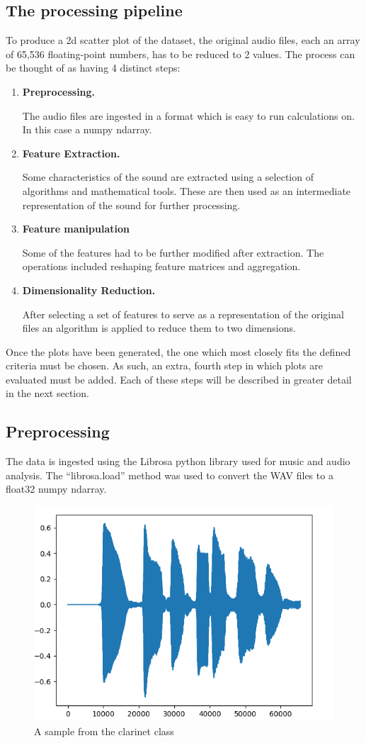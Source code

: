 \documentclass[11pt]{article}
\begin{document}
\subsection{The processing pipeline}
\label{sec:org82c3cb3}

To produce a 2d scatter plot of the dataset, the original audio files, each an array of 65,536 floating-point numbers, has to be reduced to 2 values.
The process can be thought of as having 4 distinct steps:
\begin{enumerate}
\item \textbf{ Preprocessing. }

The audio files are ingested in a format which is easy to run calculations on. In this case a numpy ndarray.
\item \textbf{ Feature Extraction. }

Some characteristics of the sound are extracted using a selection of algorithms and mathematical tools. These are then used as an intermediate representation of the sound for further processing.
\item \textbf{ Feature manipulation }

Some of the features had to be further modified after extraction. The operations included reshaping feature matrices and aggregation.
\item \textbf{ Dimensionality Reduction. }

After selecting a set of features to serve as a representation of the original files an algorithm is applied to reduce them to two dimensions.
\end{enumerate}
Once the plots have been generated, the one which most closely fits the defined criteria must be chosen. As such, an extra, fourth step in which plots are evaluated must be added. Each of these steps will be described in greater detail in the next section.

\subsection{Preprocessing}
\label{sec:org1f10704}

The data is ingested using the Librosa python library \cite{librosa} used for music and audio analysis. The ``librosa.load'' method was used to convert the WAV files to a float32 numpy ndarray.

\begin{figure}[h!]
\centering
\includegraphics[width=.7\textwidth]{./Figures/original_sample.png}
\caption{\label{fig:example-fig}A sample from the clarinet class}
\end{figure}
\end{document}
